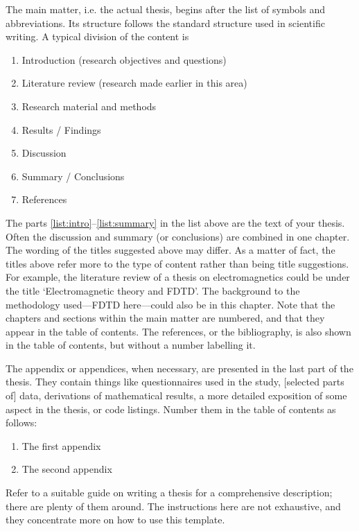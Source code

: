 \documentclass[english, 12pt, a4paper, sci, utf8, a-2b, online]{aaltothesis}
\begin{document}
The main matter, i.e. the actual thesis, begins after the list of symbols and 
abbreviations. Its structure follows the standard structure used in scientific 
writing. A typical division of the content is
\begin{enumerate}
	\item \label{list:intro} Introduction (research objectives and questions)
	\item Literature review (research made earlier in this area)
	\item Research material and methods
	\item Results / Findings
	\item Discussion
	\item \label{list:summary} Summary / Conclusions
	\item References
\end{enumerate}
The parts \ref{list:intro}--\ref{list:summary} in the list above are the text  
of your thesis. Often the discussion and summary (or conclusions) are combined 
in one chapter. The wording of the titles suggested above may differ. As a 
matter of fact, the titles above refer more to the type of content rather than 
being title suggestions. For example, the literature review of a thesis on 
electromagnetics could be under the title ‘Electromagnetic theory and FDTD’. 
The background to the methodology used---FDTD here---could also be in this 
chapter. Note that the chapters and sections within the main matter are 
numbered, and that they appear in the table of contents. The references, or the 
bibliography, is also shown in the table of contents, but without a number 
labelling it.

The appendix or appendices, when necessary, are presented in the last part of
the thesis. They contain things like questionnaires used in the study, 
[selected parts of] data, derivations of mathematical results, a more detailed 
exposition of some aspect in the thesis, or code listings. Number them in the 
table of contents as follows:
\begin{enumerate}
\renewcommand{\labelenumi}{\Alph{enumi}.}
	\item The first appendix
	\item The second appendix
\end{enumerate}

Refer to a suitable guide on writing a thesis for a comprehensive description;
there are plenty of them around. The instructions here are not exhaustive, and
they concentrate more on how to use this template.
\end{document}
